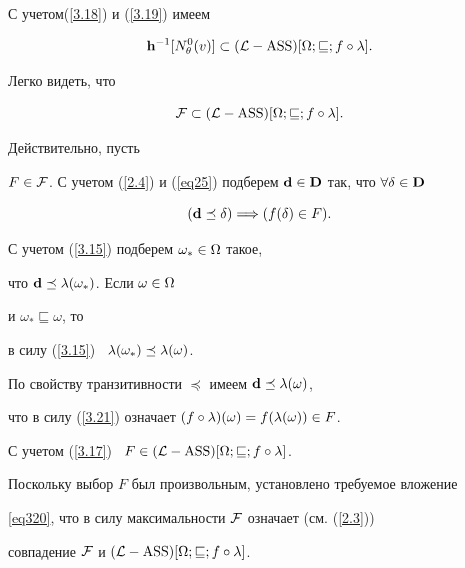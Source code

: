 {\begin{pf}
С учетом\linebreak (\ref{3.18}) и (\ref{3.19}) имеем


\begin{equation}\label{3.20}


{{\bold h}^{-1}}[{N_\theta^0}(v)] \subset ({\cal L}-\ASS)[\Om;


\sqsubseteq;f\circ\ld].


\end{equation}


Легко видеть, что


\begin{equation}\label{eq320}


{\cal F} \subset


({\cal L}-\ASS)[\Om;\sqsubseteq;f\circ\ld].


\end{equation}


Действительно, пусть 


$F \in {\cal F}$. С учетом (\ref{2.4}) и (\ref{eq25}) подберем ${\bold d}


\in {\bold D}$ так, что $\fo{\delta} \in {\bold D}$


\begin{equation}\label{3.21}


({\bold d}\preceq\delta) \Lo (f(\delta) \in F).


\end{equation}


С учетом (\ref{3.15}) подберем ${\omega}_* \in \Omega$ такое,


что ${\bold d}\preceq{{\lambda}({\omega}_*)}$. Если $\omega \in \Omega$


и ${{\omega}_*}\sqsubseteq{\omega}$, то


в силу (\ref{3.15}) \ ${{\lambda}({\omega}_*)}\preceq{{\lambda}(\omega)}$.


По свойству транзитивности $\preceq$ имеем ${\bold d}\preceq{{\lambda}(\omega)}$,


что в силу (\ref{3.21}) означает $(f\circ\ld)(\omega) =


f({\ld}(\omega)) \in F$.


С учетом (\ref{3.17}) \ $F \in ({\cal L}-\operatorname{ASS})[\Omega;\sqsubseteq;f\circ\lambda]$.


Поскольку выбор $F$ был произвольным, установлено требуемое вложение


\eqref{eq320}, что в силу максимальности ${\cal F}$ означает (см. (\ref{2.3}))


совпадение ${\cal F}$ и $({\cal L}-\operatorname{ASS})[\Omega;\sqsubseteq;f\circ\lambda]$.



\end{pf}}
